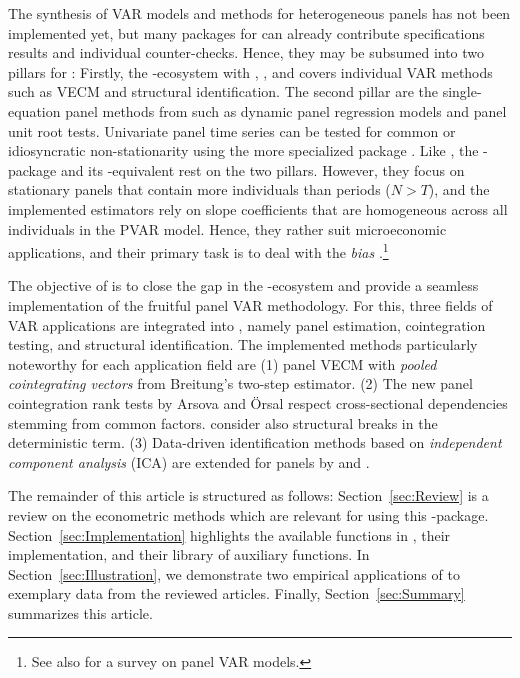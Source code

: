 The synthesis of VAR models and methods for heterogeneous panels has not been implemented yet, but many packages for  \citeyearpar{RCore2020} can already contribute specifications results and individual counter-checks. Hence, they may be subsumed into two pillars for : Firstly, the -ecosystem with  \citep{Pfaff2008},  \citep{Pfaff2008a}, and  \citep{LangeEtAl_fc} covers individual VAR methods such as VECM and structural identification. The second pillar are the single-equation panel methods from  \citep{CroissantMillo2008} such as dynamic panel regression models and panel unit root tests. Univariate panel time series can be tested for common or idiosyncratic non-stationarity using the more specialized package  \citep{Bronder2016}. Like , the -package  \citep{SigmundFerstl2019} and its -equivalent  \citep{AbrigoLove2016} rest on the two pillars. However, they focus on stationary panels that contain more individuals than periods ($ N > T $), and the implemented estimators rely on slope coefficients that are homogeneous across all individuals in the PVAR model. Hence, they rather suit microeconomic applications, and their primary task is to deal with the \textit{\citeauthor{Nickell1981} bias} \citeyearpar{Nickell1981}.\footnote{See also \citet{CanovaCiccarelli2013} for a survey on panel VAR models.} 

The objective of  is to close the gap in the -ecosystem and provide a seamless implementation of the fruitful panel VAR methodology. For this, three fields of VAR applications are integrated into , namely  panel estimation, cointegration testing, and structural identification. The implemented methods particularly noteworthy for each application field are (1) panel VECM with \textit{pooled cointegrating vectors} from Breitung's \citeyearpar{Breitung2005} two-step estimator. (2) The new panel cointegration rank tests by Arsova and Örsal \citeyearpar{ArsovaOersal2017,ArsovaOersal2018} respect cross-sectional dependencies stemming from common factors. \citet{ArsovaOersal2020} consider also structural breaks in the deterministic term. (3) Data-driven identification methods based on \textit{independent component analysis} (ICA) are extended for panels by \citet{CalhounEtAl2002} and \cite{Herwartz2017}.

The remainder of this article is structured as follows: Section~\ref{sec:Review} is a review on the econometric methods which are relevant for using this -package. Section~\ref{sec:Implementation} highlights the available functions in , their implementation, and their library of auxiliary functions. In Section~\ref{sec:Illustration}, we demonstrate two empirical applications of  to exemplary data from the reviewed articles. Finally, Section~\ref{sec:Summary} summarizes this article. 


